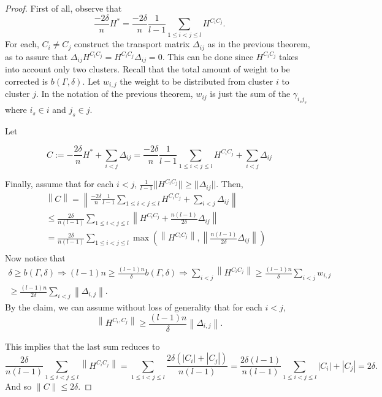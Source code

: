 \documentclass[12pt]{amsart}
\theoremstyle{remark}
\begin{document}
\begin{proof}

First of all, observe that
\[
\frac{-2\delta}{n}H^* = \frac{-2\delta}{n}\frac{1}{l-1}\sum_{1\leq i<j\leq l}H^{C_iC_j}.
\]
For each, $C_i\neq C_j$ construct the transport matrix $\Delta_{ij}$ as in the previous theorem, as to assure that $\Delta_{ij}H^{C_iC_j} = H^{C_iC_j} \Delta_{ij}=0$. This can be done since $H^{C_iC_j}$ takes into account only two clusters. Recall that the total amount of weight to be corrected is $b(\Gamma,\delta)$. Let $w_{i,j}$ the weight to be distributed from cluster $i$ to cluster $j$. In the notation of the previous theorem, $w_{ij}$ is just the sum of the 
$\gamma_{i_sj_s}$ where $i_s \in i$ and $j_s \in j$.


Let 

\[
C:= -\frac{2\delta}{n}H^* + \sum_{i<j}\Delta_{ij} = \frac{-2\delta}{n}\frac{1}{l-1}\sum_{1\leq i<j\leq l}H^{C_iC_j} + \sum_{i<j}\Delta_{ij}
\]

Finally, assume that for each $i<j$, $\frac{1}{l-1}||H^{C_iC_j}||\geq ||\Delta_{ij}||$.
Then,
\[
\begin{aligned}
\left\|C\right \| = \left\| \frac{-2\delta}{n}\frac{1}{l-1}\sum_{1\leq i<j\leq l}H^{C_iC_j} + \sum_{i<j}\Delta_{ij}  \right \| & \\ \leq \frac{2\delta}{n(l-1)}\sum_{1\leq i<j\leq l}\left \|H^{C_iC_j}+ \frac{n(l-1)}{2\delta} \Delta_{ij}\right \| & \\
= \frac{2\delta}{n(l-1)}\sum_{1\leq i<j\leq l} \max (\left\|H^{C_iC_j}\right\|,\left\|\frac{n(l-1)}{2\delta}\Delta_{ij}\right\|)& \\
\end{aligned}
\]
Now notice that 
\[
\begin{aligned}
\delta \geq b(\Gamma,\delta) \Rightarrow (l-1)n \geq \frac{(l-1)n}{\delta} b(\Gamma,\delta) \Rightarrow \sum_{i<j}\left \|H^{C_iC_j}\right \| \geq  \frac{(l-1)n}{\delta}\sum_{i<j}w_{i,j}  & \\
\geq \frac{(l-1)n}{2\delta}\sum_{i<j}\left \|\Delta_{i,j} \right \|  .
\end{aligned}
\]
By the claim, we can assume without loss of generality that
for each $i<j$,
\[
\left \|H^{C_i,C_j}\right \| \geq  \frac{(l-1)n}{\delta}\left \|\Delta_{i,j} \right \|.
\]

This implies that the last sum reduces to
\[
\frac{2\delta}{n(l-1)}\sum_{1\leq i<j\leq l} \left\|H^{C_iC_j}\right\| = \sum_{1\leq i<j\leq l} \frac{2\delta(|C_i|+|C_j|)}{n(l-1)} = \frac{2\delta(l-1)}{n(l-1)}\sum_{1\leq i<j\leq l}|C_i|+|C_j|=2\delta.
\]
And so
$\|C\| \leq 2\delta$.



\end{proof}
\end{document}
